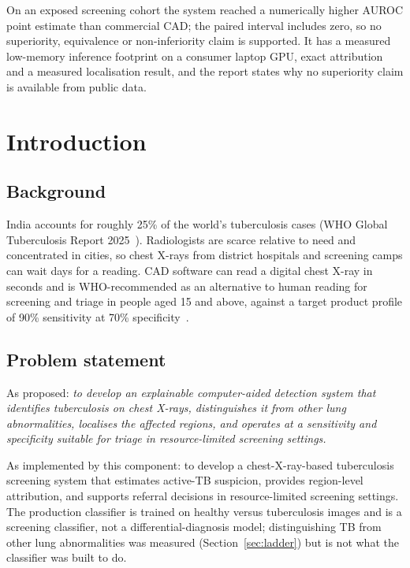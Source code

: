 \documentclass[12pt,a4paper]{report}
\begin{document}
On an exposed screening cohort the system reached a numerically higher AUROC point estimate than commercial CAD; the paired interval includes zero, so no superiority, equivalence or non-inferiority claim is supported. It has a measured low-memory inference footprint on a consumer laptop GPU, exact attribution and a measured localisation result, and the report states why no superiority claim is available from public data.
\clearpage
\tableofcontents
\clearpage

\chapter{Introduction}
\section{Background}
India accounts for roughly 25\% of the world's tuberculosis cases (WHO Global Tuberculosis Report 2025~\cite{who2025}). Radiologists are scarce relative to need and concentrated in cities, so chest X-rays from district hospitals and screening camps can wait days for a reading. CAD software can read a digital chest X-ray in seconds and is WHO-recommended as an alternative to human reading for screening and triage in people aged 15 and above, against a target product profile of 90\% sensitivity at 70\% specificity~\cite{who2021}.

\section{Problem statement}
As proposed: \emph{to develop an explainable computer-aided detection system that identifies tuberculosis on chest X-rays, distinguishes it from other lung abnormalities, localises the affected regions, and operates at a sensitivity and specificity suitable for triage in resource-limited screening settings.}

As implemented by this component: to develop a chest-X-ray-based tuberculosis screening system that estimates active-TB suspicion, provides region-level attribution, and supports referral decisions in resource-limited screening settings. The production classifier is trained on healthy versus tuberculosis images and is a screening classifier, not a differential-diagnosis model; distinguishing TB from other lung abnormalities was measured (Section~\ref{sec:ladder}) but is not what the classifier was built to do.
\end{document}
